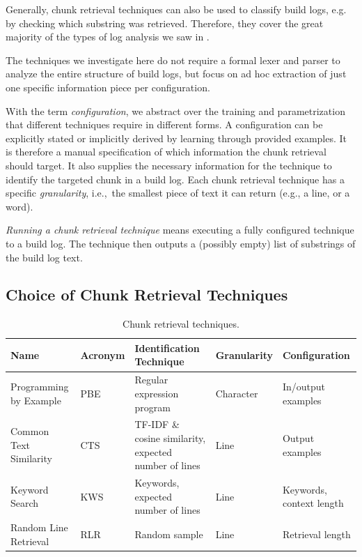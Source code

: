 Generally, chunk retrieval techniques
can also be used to classify build logs, e.g.\, by checking
which substring was retrieved.
Therefore, they
cover the great majority of the types of log analysis we saw in
.

The techniques we investigate here do not require a formal lexer and
parser to analyze the entire structure of build logs, but focus on
ad hoc extraction of just one specific information piece per
configuration.

With the term \textit{configuration}, we abstract over the training
and parametrization that different techniques require in different
forms.
A configuration can be explicitly stated or implicitly derived
by learning through provided examples.
It is therefore a manual
specification of which information the chunk retrieval should target.
It also supplies the necessary information for the technique to
identify the targeted chunk in a build log.
Each chunk
retrieval technique has a specific \textit{granularity}, i.e.,\ the
smallest piece of text it can return (e.g., a line, or a word).

\emph{Running a
chunk retrieval technique} means
executing a fully configured
technique to a build log.
The technique then outputs a (possibly empty) list of substrings of the
build log text.

\subsection{Choice of Chunk Retrieval Techniques}
\label{sec:choice}

\begin{table}[htb]
\centering
\caption{Chunk retrieval techniques.}
\begin{tabularx}{\textwidth}{@{}llXll@{}}
\toprule
Name & Acronym & Identification Technique & Granularity &
Configuration \\
\midrule
Programming by Example & PBE	 & Regular expression program
& Character   & In/output examples	\\
Common Text Similarity	     & CTS     & TF-IDF \& cosine similarity,
expected number of lines & Line        & Output examples	   \\
Keyword Search		     & KWS     & Keywords, expected number of
lines			 & Line        & Keywords, context length  \\
Random Line Retrieval	     & RLR     & Random sample
& Line	      & Retrieval length	  \\
\bottomrule
\end{tabularx}
\label{tab:techniques}
\end{table}


